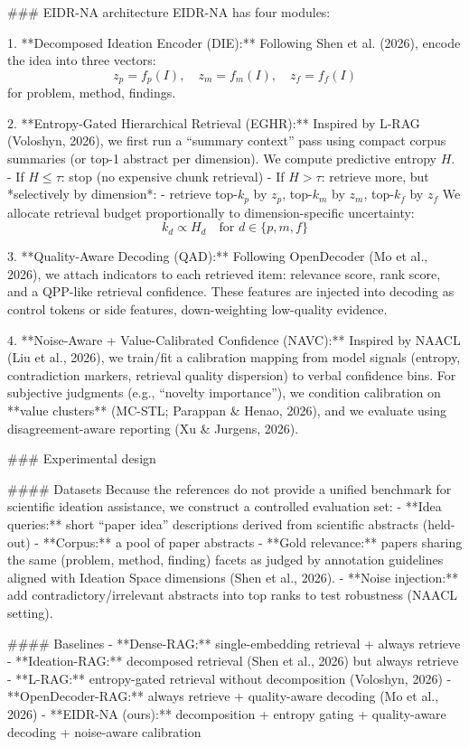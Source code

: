 ### EIDR-NA architecture  
EIDR-NA has four modules:

1. **Decomposed Ideation Encoder (DIE):**  
   Following Shen et al. (2026), encode the idea into three vectors:  
   \[
   z_p = f_p(I), \quad z_m = f_m(I), \quad z_f = f_f(I)
   \]
   for problem, method, findings.

2. **Entropy-Gated Hierarchical Retrieval (EGHR):**  
   Inspired by L-RAG (Voloshyn, 2026), we first run a “summary context” pass using compact corpus summaries (or top-1 abstract per dimension). We compute predictive entropy \(H\).  
   - If \(H \le \tau\): stop (no expensive chunk retrieval)  
   - If \(H > \tau\): retrieve more, but *selectively by dimension*:
     - retrieve top-\(k_p\) by \(z_p\), top-\(k_m\) by \(z_m\), top-\(k_f\) by \(z_f\)  
   We allocate retrieval budget proportionally to dimension-specific uncertainty:
   \[
   k_d \propto H_d \quad \text{for } d\in\{p,m,f\}
   \]

3. **Quality-Aware Decoding (QAD):**  
   Following OpenDecoder (Mo et al., 2026), we attach indicators to each retrieved item: relevance score, rank score, and a QPP-like retrieval confidence. These features are injected into decoding as control tokens or side features, down-weighting low-quality evidence.

4. **Noise-Aware + Value-Calibrated Confidence (NAVC):**  
   Inspired by NAACL (Liu et al., 2026), we train/fit a calibration mapping from model signals (entropy, contradiction markers, retrieval quality dispersion) to verbal confidence bins.  
   For subjective judgments (e.g., “novelty importance”), we condition calibration on **value clusters** (MC-STL; Parappan & Henao, 2026), and we evaluate using disagreement-aware reporting (Xu & Jurgens, 2026).

### Experimental design  

#### Datasets  
Because the references do not provide a unified benchmark for scientific ideation assistance, we construct a controlled evaluation set:
- **Idea queries:** short “paper idea” descriptions derived from scientific abstracts (held-out)  
- **Corpus:** a pool of paper abstracts  
- **Gold relevance:** papers sharing the same (problem, method, finding) facets as judged by annotation guidelines aligned with Ideation Space dimensions (Shen et al., 2026).  
- **Noise injection:** add contradictory/irrelevant abstracts into top ranks to test robustness (NAACL setting).

#### Baselines  
- **Dense-RAG:** single-embedding retrieval + always retrieve  
- **Ideation-RAG:** decomposed retrieval (Shen et al., 2026) but always retrieve  
- **L-RAG:** entropy-gated retrieval without decomposition (Voloshyn, 2026)  
- **OpenDecoder-RAG:** always retrieve + quality-aware decoding (Mo et al., 2026)  
- **EIDR-NA (ours):** decomposition + entropy gating + quality-aware decoding + noise-aware calibration

